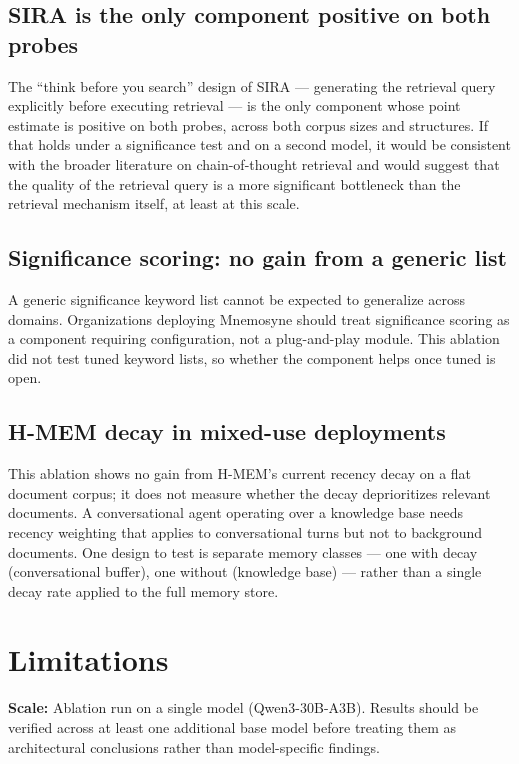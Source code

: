 \documentclass[11pt,a4paper]{article}
\begin{document}
\subsection{SIRA is the only component positive on both probes}

The ``think before you search'' design of SIRA --- generating the retrieval query explicitly before executing retrieval --- is the only component whose point estimate is positive on both probes, across both corpus sizes and structures. If that holds under a significance test and on a second model, it would be consistent with the broader literature on chain-of-thought retrieval and would suggest that the quality of the retrieval query is a more significant bottleneck than the retrieval mechanism itself, at least at this scale.

\subsection{Significance scoring: no gain from a generic list}

A generic significance keyword list cannot be expected to generalize across domains. Organizations deploying Mnemosyne should treat significance scoring as a component requiring configuration, not a plug-and-play module. This ablation did not test tuned keyword lists, so whether the component helps once tuned is open.

\subsection{H-MEM decay in mixed-use deployments}

This ablation shows no gain from H-MEM's current recency decay on a flat document corpus; it does not measure whether the decay deprioritizes relevant documents. A conversational agent operating over a knowledge base needs recency weighting that applies to conversational turns but not to background documents. One design to test is separate memory classes --- one with decay (conversational buffer), one without (knowledge base) --- rather than a single decay rate applied to the full memory store.

\section{Limitations}

\textbf{Scale:} Ablation run on a single model (Qwen3-30B-A3B). Results should be verified across at least one additional base model before treating them as architectural conclusions rather than model-specific findings.
\end{document}

